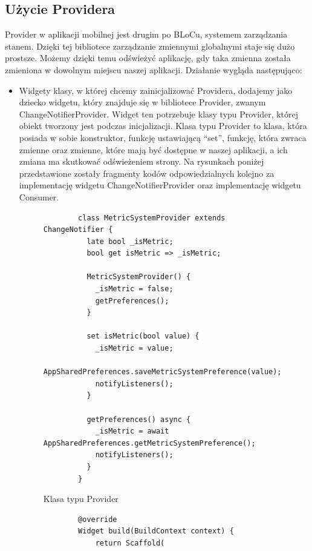 \documentclass[a4paper,twoside,12pt]{book}
\begin{document}
\subsection{Użycie Providera}

Provider w aplikacji mobilnej jest drugim po BLoCu, systemem zarządzania stanem. Dzięki tej bibliotece zarządzanie zmiennymi globalnymi staje się dużo prostsze. Możemy dzięki temu odświeżyć aplikację, gdy taka zmienna została zmieniona w dowolnym miejscu naszej aplikacji. Działanie wygląda następująco:
\begin{itemize}
    \item Widgety klasy, w której chcemy zainicjalizować Providera, dodajemy jako dziecko widgetu, który znajduje się w bibliotece Provider, zwanym ChangeNotifierProvider. Widget ten potrzebuje klasy typu Provider, której obiekt tworzony jest podczas inicjalizacji. Klasa typu Provider to klasa, która posiada w sobie konstruktor, funkcję ustawiającą ``set'', funkcję, która zwraca zmienne oraz zmienne, które mają być dostępne w naszej aplikacji, a ich zmiana ma skutkować odświeżeniem strony. Na rysunkach poniżej przedstawione zostały fragmenty kodów odpowiedzialnych kolejno za implementację widgetu ChangeNotifierProvider oraz implementację widgetu Consumer.
    \begin{figure}[H]
        \begin{lstlisting}
        class MetricSystemProvider extends ChangeNotifier {
          late bool _isMetric;
          bool get isMetric => _isMetric;
        
          MetricSystemProvider() {
            _isMetric = false;
            getPreferences();
          }
        
          set isMetric(bool value) {
            _isMetric = value;
            AppSharedPreferences.saveMetricSystemPreference(value);
            notifyListeners();
          }
        
          getPreferences() async {
            _isMetric = await AppSharedPreferences.getMetricSystemPreference();
            notifyListeners();
          }
        }
        \end{lstlisting}
    \caption{Klasa typu Provider}
    \label{fig:pseudokod:listings}
    \end{figure}
    \newpage
    \begin{figure}[H]
        \begin{lstlisting}
        @override
        Widget build(BuildContext context) {
            return Scaffold(


\end{lstlisting}
\end{figure}
\end{itemize}
\end{document}
